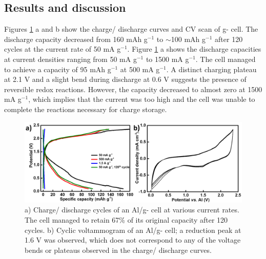 \subsection{Results and discussion}
Figures \ref{Figures/chap6fig:CNUcdccv} a and b show the charge/ discharge curves and CV scan of g- cell. The discharge capacity decreased from 160 mAh g$^{-1}$ to $\sim$100 mAh g$^{-1}$ after 120 cycles at the current rate of 50 mA g$^{-1}$. Figure \ref{Figures/chap6fig:CNUcdccv} a shows the discharge capacities at current densities ranging from 50 mA g$^{-1}$ to 1500 mA g$^{-1}$. The cell managed to achieve a capacity of 95 mAh g$^{-1}$ at 500 mA g$^{-1}$. A distinct charging plateau at 2.1 V and a slight bend during discharge at 0.6 V suggests the presence of reversible redox reactions. However, the capacity decreased to almost zero at 1500 mA g$^{-1}$, which implies that the current was too high and the cell was unable to complete the reactions necessary for charge storage. 

\begin{figure}[th!]
\centering
\includegraphics[width=\textwidth]{Figures/chap6fig/CNUcdccv}
\caption{a) Charge/ discharge cycles of an Al/g- cell at various current rates. The cell managed to retain 67\% of its original capacity after 120 cycles. b) Cyclic voltammogram of an Al/g- cell; a reduction peak at 1.6 V was observed, which does not correspond to any of the voltage bends or plateaus observed in the charge/ discharge curves. }
\label{Figures/chap6fig:CNUcdccv}
\end{figure}

